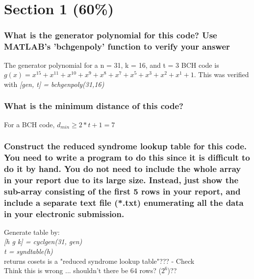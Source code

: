 \documentclass[a4paper]{report}
\begin{document}
\section*{Section 1 (60\%)}

\subsubsection*{What is the generator polynomial for this code? Use MATLAB’s ’bchgenpoly’ function to verify your answer}

The generator polynomial for a n = 31, k = 16, and t = 3 BCH code is $g(x) = x^{15} + x^{11} + 
x^{10} + x^{9} + x^{8} + x^{7} + x^{5} + x^{3} + x^{2} + x^{1} + 1$. 
This was verified with \textit{[gen, t] = bchgenpoly(31,16)} \\

\subsubsection*{What is the minimum distance of this code?}

For a BCH code, $d_{min} \geq 2*t + 1 = 7$ \\

\subsubsection*{Construct the reduced syndrome lookup table for this code. You need
to write a program to do this since it is difficult to do it by hand. You
do not need to include the whole array in your report due to its large
size. Instead, just show the sub-array consisting of the first 5 rows in your
report, and include a separate text file (*.txt) enumerating all the data in
your electronic submission.}

Generate table by: \\
\textit{[h g k] = cyclgen(31, gen)}\\
\textit{t = syndtable(h)}\\

returns cosets is a "reduced syndrome lookup table"??? - Check \\
Think this is wrong ... shouldn't there be 64 rows? ($2^6$)?? \\
\end{document}
